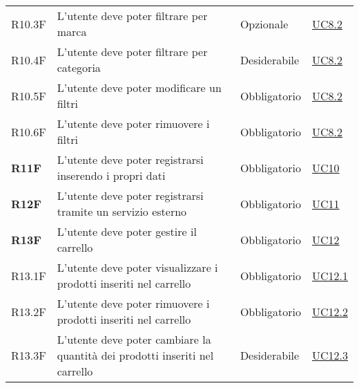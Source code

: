\begin{center}
\begin{longtable}[!h]{p{50px} p{245px} p{75px} p{50px}}
        R10.3F                                & L'utente deve poter filtrare per marca                                                            & Opzionale                & \hyperref[sec:UC8.2]{UC8.2}                  \\
        R10.4F                                & L'utente deve poter filtrare per categoria                                                        & Desiderabile             & \hyperref[sec:UC8.2]{UC8.2}                  \\
        R10.5F                                & L'utente deve poter modificare un filtri                                                          & Obbligatorio             & \hyperref[sec:UC8.2]{UC8.2}                  \\
        R10.6F                                & L'utente deve poter rimuovere i filtri                                                            & Obbligatorio             & \hyperref[sec:UC8.2]{UC8.2}                  \\
        \textbf{R11F}                         & L'utente deve poter registrarsi inserendo i propri dati                                             & Obbligatorio             & \hyperref[sec:UC10]{UC10}                    \\
        \textbf{R12F}                         & L'utente deve poter registrarsi tramite un servizio esterno                                         & Obbligatorio             & \hyperref[sec:UC11]{UC11}                    \\
        \textbf{R13F}                         & L'utente deve poter gestire il carrello                                                             & Obbligatorio             & \hyperref[sec:UC12]{UC12}                    \\
        R13.1F                                & L'utente deve poter visualizzare i prodotti inseriti nel carrello                                   & Obbligatorio             & \hyperref[sec:UC12.1]{UC12.1}                \\
        R13.2F                                & L'utente deve poter rimuovere i prodotti inseriti nel carrello                                      & Obbligatorio             & \hyperref[sec:UC12.2]{UC12.2}                \\
        R13.3F                                & L'utente deve poter cambiare la quantità dei prodotti inseriti nel carrello                         & Desiderabile             & \hyperref[sec:UC12.3]{UC12.3}                \\

\end{longtable}
\end{center}
